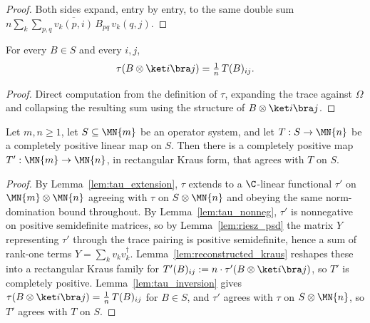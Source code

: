 \begin{proof}\leanok
    Both sides expand, entry by entry, to the same double sum
    $n\sum_k\sum_{p,q}\overline{v_k(p,i)}\,B_{pq}\,v_k(q,j)$.
\end{proof}

\begin{lemma}
    \label{lem:tau_inversion}
    \leanok
    For every $B\in S$ and every $i,j$,
    \[
        \tau(B\otimes\ket i\bra j)=\tfrac1n\,T(B)_{ij}.
    \]
\end{lemma}

\begin{proof}\leanok
    Direct computation from the definition of $\tau$, expanding the trace
    against $\Omega$ and collapsing the resulting sum using the structure
    of $B\otimes\ket i\bra j$.
\end{proof}

\begin{theorem}
    \label{thm:extend_cp_operator_system}
    \leanok
    Let $m,n\ge1$, let $S\subseteq\MN{m}$ be an operator system, and let
    $T:S\to\MN{n}$ be a completely positive linear map on $S$. Then there
    is a completely positive map $T':\MN{m}\to\MN{n}$, in rectangular Kraus
    form, that agrees with $T$ on $S$.
\end{theorem}

\begin{proof}\leanok
    By Lemma~\ref{lem:tau_extension}, $\tau$ extends to a $\C$-linear
    functional $\tau'$ on $\MN{m}\otimes\MN{n}$ agreeing with $\tau$ on
    $S\otimes\MN{n}$ and obeying the same norm-domination bound throughout.
    By Lemma~\ref{lem:tau_nonneg}, $\tau'$ is nonnegative on positive
    semidefinite matrices, so by Lemma~\ref{lem:riesz_psd} the matrix $Y$
    representing $\tau'$ through the trace pairing is positive
    semidefinite, hence a sum of rank-one terms $Y=\sum_kv_kv_k^\dagger$.
    Lemma~\ref{lem:reconstructed_kraus} reshapes these into a rectangular
    Kraus family for $T'(B)_{ij}:=n\cdot\tau'(B\otimes\ket i\bra j)$, so
    $T'$ is completely positive. Lemma~\ref{lem:tau_inversion} gives
    $\tau(B\otimes\ket i\bra j)=\tfrac1n\,T(B)_{ij}$ for $B\in S$, and
    $\tau'$ agrees with $\tau$ on $S\otimes\MN{n}$, so $T'$ agrees with $T$
    on $S$.
\end{proof}

